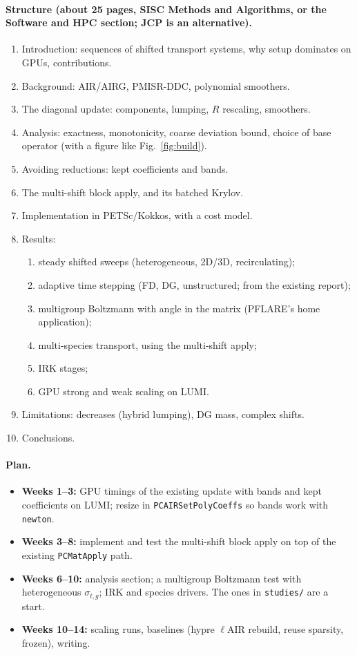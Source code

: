 \documentclass[11pt,a4paper]{article}
\begin{document}
\paragraph{Structure (about 25 pages, SISC Methods and Algorithms, or the Software and HPC section; JCP is an alternative).}
\begin{enumerate}
\item Introduction: sequences of shifted transport systems, why setup dominates on GPUs, contributions.
\item Background: AIR/AIRG, PMISR-DDC, polynomial smoothers.
\item The diagonal update: components, lumping, $R$ rescaling, smoothers.
\item Analysis: exactness, monotonicity, coarse deviation bound, choice of base operator (with a figure like Fig.~\ref{fig:build}).
\item Avoiding reductions: kept coefficients and bands.
\item The multi-shift block apply, and its batched Krylov.
\item Implementation in PETSc/Kokkos, with a cost model.
\item Results:
  \begin{enumerate}[label=(\alph*)]
  \item steady shifted sweeps (heterogeneous, 2D/3D, recirculating);
  \item adaptive time stepping (FD, DG, unstructured; from the existing report);
  \item multigroup Boltzmann with angle in the matrix (PFLARE's home application);
  \item multi-species transport, using the multi-shift apply;
  \item IRK stages;
  \item GPU strong and weak scaling on LUMI.
  \end{enumerate}
\item Limitations: decreases (hybrid lumping), DG mass, complex shifts.
\item Conclusions.
\end{enumerate}

\paragraph{Plan.}
\begin{itemize}
\item \textbf{Weeks 1--3:} GPU timings of the existing update with bands and kept coefficients on LUMI; resize in \texttt{PCAIRSetPolyCoeffs} so bands work with \texttt{newton}.
\item \textbf{Weeks 3--8:} implement and test the multi-shift block apply on top of the existing \texttt{PCMatApply} path.
\item \textbf{Weeks 6--10:} analysis section; a multigroup Boltzmann test with heterogeneous $\sigma_{t,g}$; IRK and species drivers. The ones in \texttt{studies/} are a start.
\item \textbf{Weeks 10--14:} scaling runs, baselines (hypre $\ell$AIR rebuild, reuse sparsity, frozen), writing.
\end{itemize}
\end{document}
